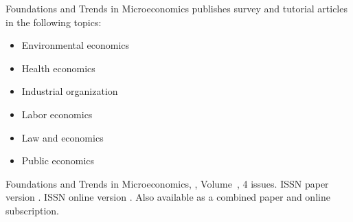 


\journalaimsandscope
 {%
  Foundations and Trends\textsuperscript{\textregistered} in
  Microeconomics publishes
 survey and tutorial articles in the following topics:
 \begin{multicols}{2}\raggedcolumns
 \begin{itemize}
\item{Environmental economics}
\item{Health economics}
\item{Industrial organization}
\item{Labor economics}
\item{Law and economics}
\item{Public economics}
\end{itemize}
 \end{multicols}
 }


\journallibraryinfo
 {%
  Foundations and Trends\textsuperscript{\textregistered} in
  Microeconomics, ,
  Volume~, 4 issues.
  ISSN paper version .
  ISSN online version .
  Also available as a combined paper and online
  subscription.
 } 